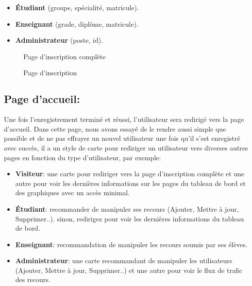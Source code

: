 \documentclass[12pt]{report}
\begin{document}
\begin{itemize}
  \item \textbf{Étudiant} (groupe, spécialité, matricule).
  \item \textbf{Enseignant} (grade, diplôme, matricule).
  \item \textbf{Administrateur} (poste, id).
\end{itemize}

\begin{figure}[h]
\centering
  \hspace*{-0.33in}
\caption{Page d'inscription complète}
\end{figure}

\newpage

\begin{figure}[h]
\centering
  \hspace*{-0.33in}
\caption{Page d'inscription}
\end{figure}

\vspace*{-0.25in}

\subsection{Page d'accueil:}

Une fois l'enregistrement terminé et réussi, l'utilisateur sera redirigé vers la page d'accueil. Dans cette page, nous avons essayé de le rendre aussi simple que possible et de ne pas effrayer un nouvel utilisateur une fois qu'il s'est enregistré avec succès, il a un style de carte pour rediriger un utilisateur vers diverses autres pages en fonction du type d'utilisateur, par exemple:

\begin{itemize}
  \item \textbf{Visiteur}: une carte pour rediriger vers la page d'inscription complète et une autre pour voir les dernières informations sur les pages du tableau de bord et des graphiques avec un accès minimal.
  \item \textbf{Étudiant}: recommander de manipuler ses recours (Ajouter, Mettre à jour, Supprimer..). sinon, redirigez pour voir les dernières informations du tableau de bord.
  \item \textbf{Enseignant}: recommandation de manipuler les recours soumis par ses élèves.
  \item \textbf{Administrateur}: une carte recommandant de manipuler les utilisateurs (Ajouter, Mettre à jour, Supprimer..)
et une autre pour voir le flux de trafic des recours.
\end{itemize}
\end{document}
